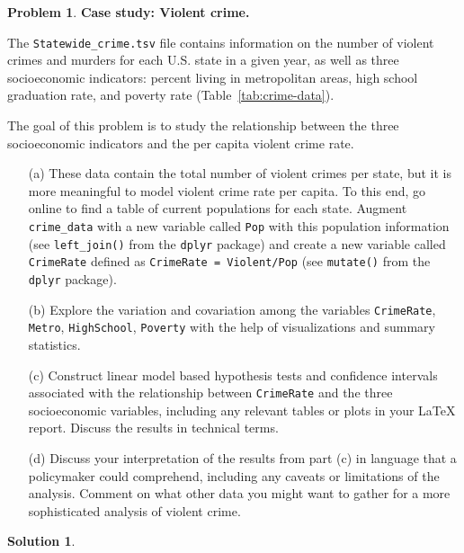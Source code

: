 \documentclass[11pt,letterpaper,english,oneside]{article} %
\theoremstyle{definition} %
\newtheorem{problem}{Problem}
\newtheorem{solution}{Solution}
\newenvironment{prob}{\clearpage \begin{problem}\hspace{0pt}}{\end{problem}}
\newenvironment{sol}{\begin{solution}\hspace{0pt}}{\end{solution}}
\begin{document}
    \begin{prob} \label{prob:data}\textbf{Case study: Violent crime.}
    
    \noindent The \texttt{Statewide\_crime.tsv} file contains information on the number of violent crimes and murders for each U.S. state in a given year, as well as three socioeconomic indicators: percent living in metropolitan areas, high school graduation rate, and poverty rate (Table~\ref{tab:crime-data}).

    

    \noindent The goal of this problem is to study the relationship between the three socioeconomic indicators and the per capita violent crime rate.
    
    \begin{itemize}
    \item[(a)] These data contain the total number of violent crimes per state, but it is more meaningful to model violent crime rate per capita. To this end, go online to find a table of current populations for each state. Augment \verb|crime_data| with a new variable called \verb|Pop| with this population information (see \verb|left_join()| from the \verb|dplyr| package) and create a new variable called \verb|CrimeRate| defined as \verb|CrimeRate = Violent/Pop| (see \verb|mutate()| from the \verb|dplyr| package).
    
    \item[(b)] Explore the variation and covariation among the variables \verb|CrimeRate|, \verb|Metro|, \verb|HighSchool|, \verb|Poverty| with the help of visualizations and summary statistics.
    
    \item[(c)] Construct linear model based hypothesis tests and confidence intervals associated with the relationship between \verb|CrimeRate| and the three socioeconomic variables, including any relevant tables or plots in your LaTeX report. Discuss the results in technical terms.
    
    \item[(d)] Discuss your interpretation of the results from part (c) in language that a policymaker could comprehend, including any caveats or limitations of the analysis. Comment on what other data you might want to gather for a more sophisticated analysis of violent crime.
    
    \end{itemize}
    
    \end{prob}
    \begin{sol}
    \end{sol}
\end{document}
